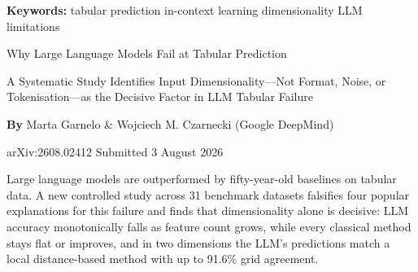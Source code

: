 \documentclass[10pt,twocolumn]{article}
\begin{document}
\setlength{\parindent}{0pt}
\setlength{\parskip}{4pt}

{\small\color{keywordgray}\textbf{Keywords:}
  tabular prediction \textbullet{}
  in-context learning \textbullet{}
  dimensionality \textbullet{}
  LLM limitations}\par\vspace{4pt}

{\LARGE\bfseries\raggedright
  Why Large Language Models Fail at Tabular Prediction}\par\vspace{4pt}

{\large\itshape\raggedright
  A Systematic Study Identifies Input Dimensionality---Not Format, Noise, or
  Tokenisation---as the Decisive Factor in LLM Tabular Failure}\par\vspace{6pt}

{\small\textbf{By} Marta Garnelo \& Wojciech M. Czarnecki
  (Google DeepMind)}\par\vspace{2pt}

{\small\color{keywordgray}arXiv:2608.02412 \textbullet{} Submitted 3 August 2026}
\par\vspace{2pt}\noindent{\color{rulered}\rule{\columnwidth}{0.6pt}}\vspace{6pt}

Large language models are outperformed by fifty-year-old baselines on tabular
data. A new controlled study across 31 benchmark datasets falsifies four popular
explanations for this failure and finds that dimensionality alone is decisive:
LLM accuracy monotonically falls as feature count grows, while every classical
method stays flat or improves, and in two dimensions the LLM's predictions match
a local distance-based method with up to 91.6\% grid agreement.
\end{document}
